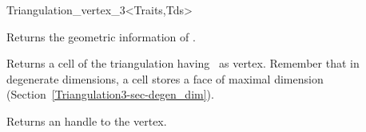 \begin{ccClassTemplate}{Triangulation_vertex_3<Traits,Tds>}
\begin{ccAdvanced}
\end{ccAdvanced}

\ccAccessFunctions

{Returns the geometric information of \ccVar.}

{Returns a cell of the triangulation having \ccVar\ as
vertex. Remember that in degenerate dimensions, a cell stores a face
of maximal dimension (Section~\ref{Triangulation3-sec-degen_dim}).}

{Returns an handle to the vertex.}



	\end{ccClassTemplate} 

